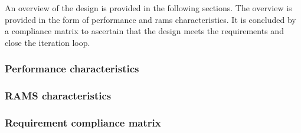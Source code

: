 An overview of the design is provided in the following sections. The overview is provided in the form of performance and \acrfull{rams} characteristics. It is concluded by a compliance matrix to ascertain that the design meets the requirements and close the iteration loop.

\subsubsection{Performance characteristics} \label{sec:perf}


\newpage
\subsubsection{RAMS characteristics} \label{sec:rams}


\newpage
\subsubsection{Requirement compliance matrix} \label{sec:ComMat}







